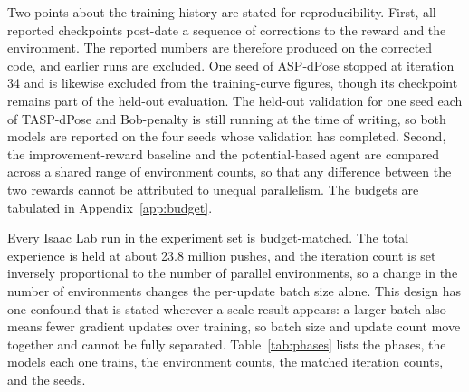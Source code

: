 Two points about the training history are stated for reproducibility. First, all
reported checkpoints post-date a sequence of corrections to the reward and the
environment. The reported numbers are therefore produced on the corrected code,
and earlier runs are excluded. One seed of ASP-dPose stopped at iteration 34 and
is likewise excluded from the training-curve figures, though its checkpoint
remains part of the held-out evaluation. The held-out validation for one seed
each of TASP-dPose and Bob-penalty is still running at the time of writing, so
both models are reported on the four seeds whose validation has completed.
Second, the improvement-reward baseline
and the potential-based agent are compared across a shared range of environment
counts, so that any difference between the two rewards cannot be attributed to
unequal parallelism. The budgets are tabulated in Appendix~\ref{app:budget}.

Every Isaac Lab run in the experiment set is budget-matched. The total experience
is held at about 23.8 million pushes, and the iteration count is set inversely
proportional to the number of parallel environments, so a change in the number of
environments changes the per-update batch size alone. This design has one confound that is
stated wherever a scale result appears: a larger batch also means fewer gradient
updates over training, so batch size and update count move together and cannot be
fully separated. Table~\ref{tab:phases} lists the phases, the models each one
trains, the environment counts, the matched iteration counts, and the seeds.

